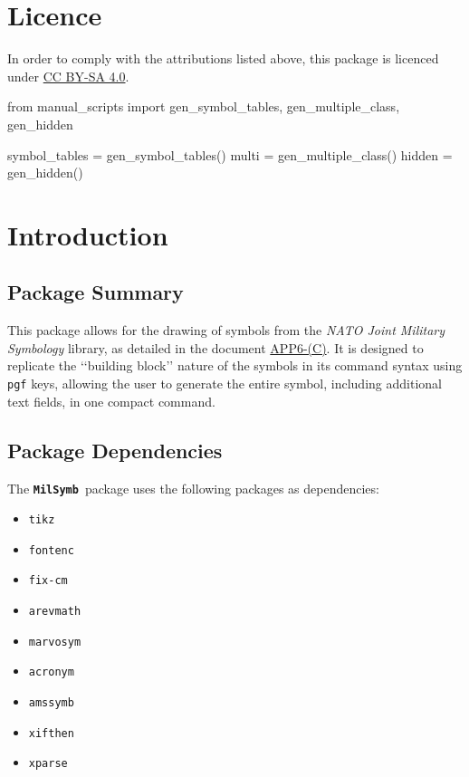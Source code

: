 \documentclass[a4paper, titlepage]{article}
\newcommand\MilSymb{\textbf{\texttt{MilSymb}}}
\newcommand\DocLink{\href{https://web.archive.org/web/20150921231042/http://armawiki.zumorc.de/files/NATO/APP-6(C).pdf}{APP6-(C)}}
\begin{document}
\section*{Licence}
In order to comply with the attributions listed above, this package is licenced under \href{https://creativecommons.org/licenses/by-sa/4.0/}{CC BY-SA 4.0}.

\clearpage

\tableofcontents

\clearpage

\begin{pycode}
  from manual_scripts import gen_symbol_tables, gen_multiple_class, gen_hidden

  symbol_tables = gen_symbol_tables()
  multi = gen_multiple_class()
  hidden = gen_hidden()

\end{pycode}

\section{Introduction}

\subsection{Package Summary}

This package allows for the drawing of symbols from the \textit{NATO Joint Military Symbology} library, as detailed in the document \DocLink. It is designed to replicate the \lq\lq{}building block\rq\rq{} nature of the symbols in its command syntax using \texttt{pgf} keys, allowing the user to generate the entire symbol, including additional text fields, in one compact command.

\subsection{Package Dependencies}

The \MilSymb\  package uses the following packages as dependencies:

\begin{itemize}
\item \texttt{tikz}
\item \texttt{fontenc}
\item \texttt{fix-cm}
\item \texttt{arevmath}
\item \texttt{marvosym}
\item \texttt{acronym}
\item \texttt{amssymb}
\item \texttt{xifthen}
\item \texttt{xparse}
\end{itemize}
\end{document}
